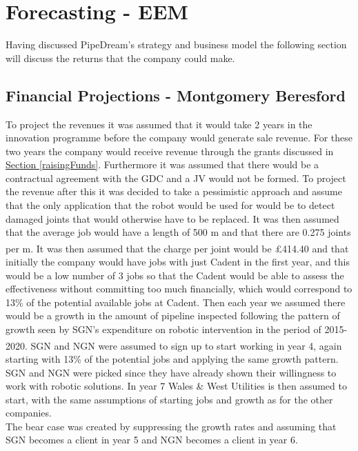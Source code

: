 \documentclass[11pt]{article}		%
\newcommand{\supercite}[1]{\textsuperscript{\cite{#1}}}		%
\newcommand{\sectref}[1]{\hyperref[#1]{Section \ref*{#1}}}     %
\begin{document}
 	\section{Forecasting - EEM}
 	
 	Having discussed PipeDream's strategy and business model the following section will discuss the  returns that the company could make.
        

	        \subsection[Financial Projections]{Financial Projections - Montgomery Beresford}
		        	        
		        To project the revenues it was assumed that it would take 2 years in the innovation programme before the company would generate sale revenue. For these two years the company would receive revenue through the grants discussed in \sectref{raisingFunds}. Furthermore it was assumed that there would be a contractual agreement with the GDC and a JV would not be formed.  
	            To project the revenue after this it was decided to take a pessimistic approach and assume that the only application that the robot would be used for would be to detect damaged joints that would otherwise have to be replaced. It was then assumed that the average job would have a length of 500 m and that there are 0.275 joints per m.\supercite{SGN_Southern} It was then assumed that the charge per joint would be £414.40 and that initially the company would have jobs with just Cadent in the first year, and this would be a low number of 3 jobs so that the Cadent would be able to assess the effectiveness without committing too much financially, which would correspond to 13\% of the potential available jobs at Cadent. Then each year we assumed there would be a growth in the amount of pipeline inspected following the pattern of growth seen by SGN’s expenditure on robotic intervention in the period of 2015-2020.\supercite{SGN_Southern} SGN and NGN were assumed to sign up to start working in year 4, again starting with 13\% of the potential jobs and applying the same growth pattern. SGN and NGN were picked since they have already shown their willingness to work with robotic solutions. In year 7 Wales \& West Utilities is then assumed to start, with the same assumptions of starting jobs and growth as for the other companies.
	            \\
			    The bear case was created by suppressing the growth rates and assuming that SGN becomes a client in year 5 and NGN becomes a client in year 6.
\end{document}
